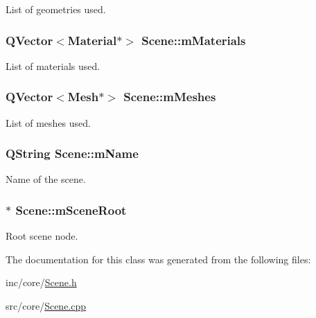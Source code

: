 List of geometries used. 

\hypertarget{class_scene_a30c33e5924edf69d4509c25945e6176e}{
\subsubsection[{m\+Materials}]{\setlength{\rightskip}{0pt plus 5cm}Q\+Vector$<${\bf Material}$\ast$$>$ Scene\+::m\+Materials\hspace{0.3cm}{\ttfamily [private]}}}\label{class_scene_a30c33e5924edf69d4509c25945e6176e}


List of materials used. 

\hypertarget{class_scene_a9f78af49e4984a661cda648e6c211e0c}{
\subsubsection[{m\+Meshes}]{\setlength{\rightskip}{0pt plus 5cm}Q\+Vector$<${\bf Mesh}$\ast$$>$ Scene\+::m\+Meshes\hspace{0.3cm}{\ttfamily [private]}}}\label{class_scene_a9f78af49e4984a661cda648e6c211e0c}


List of meshes used. 

\hypertarget{class_scene_acfce52e7dbef4c558420dcff71ebaea2}{
\subsubsection[{m\+Name}]{\setlength{\rightskip}{0pt plus 5cm}Q\+String Scene\+::m\+Name\hspace{0.3cm}{\ttfamily [private]}}}\label{class_scene_acfce52e7dbef4c558420dcff71ebaea2}


Name of the scene. 

\hypertarget{class_scene_a3852bae07cc9951aba145324ca8ff660}{
\subsubsection[{m\+Scene\+Root}]{$\ast$ Scene\+::m\+Scene\+Root\hspace{0.3cm}{\ttfamily [private]}}}\label{class_scene_a3852bae07cc9951aba145324ca8ff660}


Root scene node. 



The documentation for this class was generated from the following files\+:\begin{DoxyCompactItemize}
\item 
inc/core/\hyperlink{_scene_8h}{Scene.\+h}\item 
src/core/\hyperlink{_scene_8cpp}{Scene.\+cpp}\end{DoxyCompactItemize}

